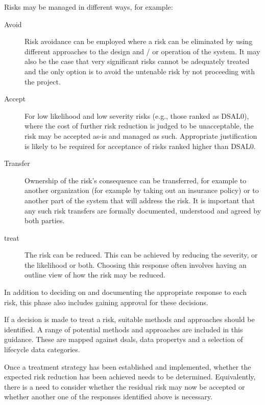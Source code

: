 Risks may be managed in different ways, for example:

\begin{description}
  \item[Avoid]Risk avoidance can be employed where a risk can be eliminated by using different approaches to the design and / or operation of the system. It may also be the case that very significant risks cannot be adequately treated and the only option is to avoid the untenable risk by not proceeding with the project.
  \item[Accept]For low likelihood and low severity risks (e.g., those ranked as DSAL0), where the cost of further risk reduction is judged to be unacceptable, the risk may be accepted as-is and managed as such. Appropriate justification is likely to be required for acceptance of risks ranked higher than DSAL0.
  \item[Transfer]Ownership of the risk's consequence can be transferred, for example to another organization \cbstart(for example by taking out an insurance policy) or to another part of the system that will address the risk\cbend. It is important that any such risk transfers are formally documented, understood and agreed by both parties.
  \item[\Gls{treat}]The risk can be reduced. This can be achieved by reducing the severity, or the likelihood or both. Choosing this \gls{response} often involves having an outline view of how the risk may be reduced.
\end{description}

In addition to deciding on and documenting the appropriate \gls{response} to each risk, this phase also includes gaining approval for these decisions.

If a decision is made to \gls{treat} a risk, suitable methods and approaches should be identified. A range of potential methods and approaches are included in this guidance. These are mapped against \glspl{dsal}, \glspl{data property} and a selection of lifecycle data categories.

Once a \gls{treatment} strategy has been established and implemented, whether the expected risk reduction has been achieved needs to be determined. Equivalently, there is a need to consider whether the residual risk may now be accepted or whether another one of the \glspl{response} identified above is necessary.

